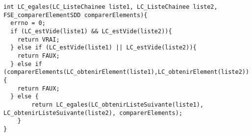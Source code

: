 \documentclass{report}
\begin{document}
\begin{lstlisting}
int LC_egales(LC_ListeChainee liste1, LC_ListeChainee liste2, FSE_comparerElementSDD comparerElements){
  errno = 0;
  if (LC_estVide(liste1) && LC_estVide(liste2)){
    return VRAI;
  } else if (LC_estVide(liste1) || LC_estVide(liste2)){
    return FAUX;
  } else if (comparerElements(LC_obtenirElement(liste1),LC_obtenirElement(liste2))!=0){
    return FAUX;
  } else {
		return LC_egales(LC_obtenirListeSuivante(liste1), LC_obtenirListeSuivante(liste2), comparerElements);
	}
}


 





\end{lstlisting}
 
\end{document}
